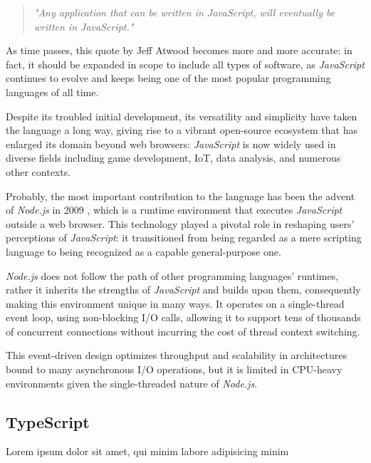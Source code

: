 \begin{quote}
  \textit{"Any application that can be written in JavaScript, will eventually be written in JavaScript."}
\end{quote}

As time passes, this quote by Jeff Atwood becomes more and more accurate:
in fact, it should be expanded in scope to include all types of software,
as \textit{JavaScript} continues to evolve and keeps being one of the most
popular programming languages of all time.

Despite its troubled initial development, its versatility and simplicity
have taken the language a long way, giving rise to a vibrant open-source ecosystem
that has enlarged its domain beyond web browsers:
\textit{JavaScript} is now widely used in diverse fields including
game development, IoT, data analysis, and numerous other contexts.

Probably, the most important contribution to the language has been
the advent of \textit{Node.js} in 2009 \cite{node}, which is a runtime environment
that executes \textit{JavaScript} outside a web browser.
This technology played a pivotal role in reshaping users' perceptions of \textit{JavaScript}:
it transitioned from being regarded as a mere scripting language
to being recognized as a capable general-purpose one.

\textit{Node.js} does not follow the path of other programming languages' runtimes,
rather it inherits the strengths of \textit{JavaScript} and builds upon them,
consequently making this environment unique in many ways.
It operates on a single-thread event loop,
using non-blocking I/O calls, allowing it to support tens of thousands
of concurrent connections without incurring the cost of thread context switching.

This event-driven design optimizes throughput and scalability in architectures
bound to many asynchronous I/O operations, but it is limited in CPU-heavy environments
given the single-threaded nature of \textit{Node.js}.

\subsection{TypeScript}

Lorem ipsum dolor sit amet, qui minim labore adipisicing minim
